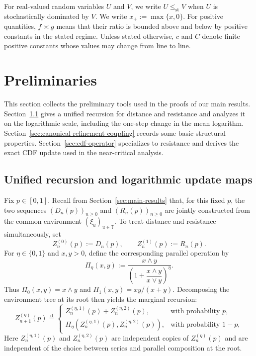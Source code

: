 \documentclass[12pt,preprint]{amsart}
\numberwithin{equation}{section}
\theoremstyle{plain}
\theoremstyle{definition}
\newcommand{\stle}{\le_{\mathrm{st}}}
\begin{document}
For real-valued random variables $U$ and $V$, we write
$U\stle V$ when $U$ is stochastically dominated by $V$.  We write
$x_+:=\max\{x,0\}$.   For positive quantities, $f\asymp g$
means that their ratio is bounded above and below by positive constants in
the stated regime.  Unless stated otherwise, $c$ and $C$ denote finite
positive constants whose values may change from line to line.

\section{Preliminaries}
\label{sec:preliminaries}

This section collects the preliminary tools used in the proofs of our main
results.  Section~\ref{sec:gate-properties} gives a unified recursion for
distance and resistance and analyzes it on the logarithmic scale, including
the one-step change in the mean logarithm.
Section~\ref{sec:canonical-refinement-coupling} records some basic structural
properties.
Section~\ref{sec:cdf-operator} specializes to resistance and derives the exact
CDF update used in the near-critical analysis.

\subsection{Unified recursion and logarithmic update maps}
\label{sec:gate-properties}

Fix $p\in[0,1]$.
Recall from Section~\ref{sec:main-results} that, for this fixed $p$, the
two sequences $(D_n(p))_{n\ge0}$ and $(R_n(p))_{n\ge0}$ are jointly
constructed from the common environment $(\xi_u)_{u\in\mathbb T}$.
To treat distance and resistance simultaneously, set
\[
 Z_n^{(0)}(p):=D_n(p),
 \qquad
 Z_n^{(1)}(p):=R_n(p).
\]
For $\eta\in\{0,1\}$ and $x,y>0$, define the corresponding
parallel operation by
\begin{equation*}
\Pi_\eta(x,y)
 :=
 \frac{x\wedge y}
 {\left(1+\dfrac{x\wedge y}{x\vee y}\right)^\eta}.
\end{equation*}
Thus $\Pi_0(x,y)=x\wedge y$ and
$\Pi_1(x,y)=xy/(x+y)$.
Decomposing the environment tree at its root then yields the marginal
recursion:
\begin{equation}
 Z_{n+1}^{(\eta)}(p)
 \overset{\mathrm d}{=}
 \begin{cases}
 Z_n^{(\eta,1)}(p)+Z_n^{(\eta,2)}(p),&\text{with probability }p,\\[2mm]
 \Pi_\eta\!\left(Z_n^{(\eta,1)}(p),Z_n^{(\eta,2)}(p)\right),
     &\text{with probability }1-p,
 \end{cases}
 \label{eq:unified-rde}
\end{equation}
Here $Z_n^{(\eta,1)}(p)$ and $Z_n^{(\eta,2)}(p)$ are independent
copies of $Z_n^{(\eta)}(p)$ and are independent of the choice between
series and parallel composition at the root.
\end{document}
